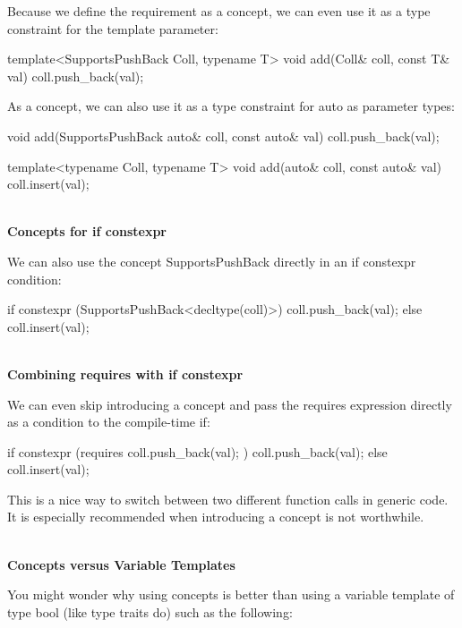 Because we define the requirement as a concept, we can even use it as a type constraint for the template parameter:

\begin{cpp}
template<SupportsPushBack Coll, typename T>
void add(Coll& coll, const T& val)
{
	coll.push_back(val);
}
\end{cpp}

As a concept, we can also use it as a type constraint for auto as parameter types:

\begin{cpp}
void add(SupportsPushBack auto& coll, const auto& val)
{
	coll.push_back(val);
}

template<typename Coll, typename T>
void add(auto& coll, const auto& val)
{
	coll.insert(val);
}
\end{cpp}

\noindent
\hspace*{\fill} \\ %
\textbf{Concepts for if constexpr}

We can also use the concept SupportsPushBack directly in an if constexpr condition:

\begin{cpp}
if constexpr (SupportsPushBack<decltype(coll)>) {
	coll.push_back(val);
}
else {
	coll.insert(val);
}
\end{cpp}

\noindent
\hspace*{\fill} \\ %
\textbf{Combining requires with if constexpr}

We can even skip introducing a concept and pass the requires expression directly as a condition to the compile-time if:

\begin{cpp}
if constexpr (requires { coll.push_back(val); }) {
	coll.push_back(val);
}
else {
	coll.insert(val);
}
\end{cpp}

This is a nice way to switch between two different function calls in generic code. It is especially recommended when introducing a concept is not worthwhile.

\noindent
\hspace*{\fill} \\ %
\textbf{Concepts versus Variable Templates}

You might wonder why using concepts is better than using a variable template of type bool (like type traits do) such as the following:

